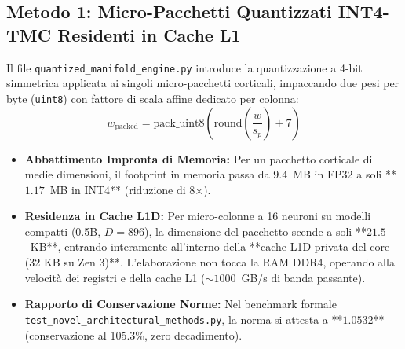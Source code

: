\documentclass[10pt,a4paper]{article}
\theoremstyle{definition}
\begin{document}
\subsection{Metodo 1: Micro-Pacchetti Quantizzati INT4-TMC Residenti in Cache L1}
Il file \texttt{quantized\_manifold\_engine.py} introduce la quantizzazione a 4-bit simmetrica applicata ai singoli micro-pacchetti corticali, impaccando due pesi per byte (\texttt{uint8}) con fattore di scala affine dedicato per colonna:
\begin{equation}
w_{\text{packed}} = \text{pack\_uint8}\left( \text{round}\left( \frac{w}{s_p} \right) + 7 \right)
\end{equation}
\begin{itemize}[leftmargin=1.5em]
    \item \textbf{Abbattimento Impronta di Memoria:} Per un pacchetto corticale di medie dimensioni, il footprint in memoria passa da $9.4$~MB in FP32 a soli **$1.17$~MB in INT4** (riduzione di 8×). 
    \item \textbf{Residenza in Cache L1D:} Per micro-colonne a 16 neuroni su modelli compatti (0.5B, $D=896$), la dimensione del pacchetto scende a soli **$21.5$~KB**, entrando interamente all'interno della **cache L1D privata del core (32 KB su Zen 3)**. L'elaborazione non tocca la RAM DDR4, operando alla velocità dei registri e della cache L1 ($\sim 1000$~GB/s di banda passante).
    \item \textbf{Rapporto di Conservazione Norme:} Nel benchmark formale \texttt{test\_novel\_architectural\_methods.py}, la norma si attesta a **$1.0532$** (conservazione al 105.3\%, zero decadimento).
\end{itemize}
\end{document}
